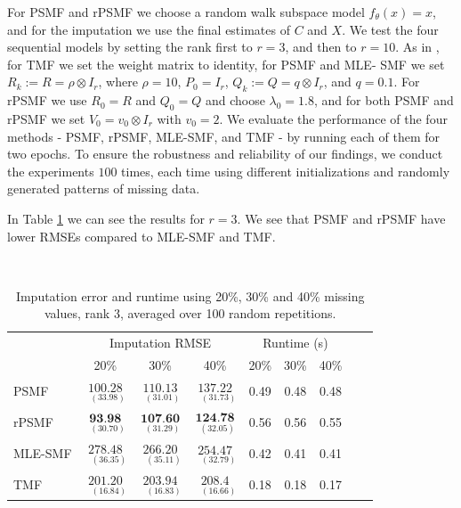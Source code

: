 \documentclass{mldsmsc}
\begin{document}
\noindent For PSMF and rPSMF we choose a random walk subspace model $f_{\theta}(x) = x$, and for the imputation we use the final estimates of $C$ and $X$. We test the four sequential models by setting the rank first to $r = 3$, and then to $r = 10$. As in \cite{akyildiz2021probabilistic}, for TMF we set the weight matrix to identity, for PSMF and MLE- SMF we set $R_k := R = \rho \otimes I_r$, where $\rho = 10$, $P_0 = I_r$, $Q_k := Q = q \otimes I_r$, and $q = 0.1$. For rPSMF we use $R_0 = R$ and $Q_0 = Q$ and choose $\lambda_0 = 1.8$, and for both PSMF and rPSMF we set $V_0 = v_0 \otimes I_r$ with $v_0 = 2$. We evaluate the performance of the four methods - PSMF, rPSMF, MLE-SMF, and TMF - by running each of them for two epochs. To ensure the robustness and reliability of our findings, we conduct the experiments $100$ times, each time using different initializations and randomly generated patterns of missing data. \newline

\noindent In Table \ref{tab:rmse3} we can see the results for $r = 3$. We see that PSMF and rPSMF have lower RMSEs compared to MLE-SMF and TMF.  \newline

\begin{table}[H]
\centering
\label{tab:rmse3}
 \\[0.5ex]
\begin{tabular}{@{}lccc|ccccc@{}}
\toprule
 & \multicolumn{3}{c}{Imputation RMSE} & \multicolumn{3}{c}{Runtime (s)} \\
 & 20\% & 30\% & 40\% & 20\% & 30\% & 40\% \\
\midrule
PSMF & $\underset{{\scriptscriptstyle \;\;(33.98)}}{100.28}$ & $\underset{{\scriptscriptstyle \;\;(31.01)}}{110.13}$ & $\underset{{\scriptscriptstyle \;\;\;(31.73)}}{137.22}$ & 0.49 & 0.48 & 0.48 \\
rPSMF & $\underset{{\scriptscriptstyle \;\;(30.70)}}{\textbf{93.98}}$ & $\underset{{\scriptscriptstyle \;\;(31.29)}}{\textbf{107.60}}$ & $\underset{{\scriptscriptstyle \;\;(32.05)}}{\textbf{124.78}}$ & 0.56 & 0.56 & 0.55 \\
MLE-SMF & $\underset{{\scriptscriptstyle \;\;\;(36.35)}}{278.48}$ & $\underset{{\scriptscriptstyle \;\;\;(35.11)}}{266.20}$ & $\underset{{\scriptscriptstyle \;\;\;(32.79)}}{254.47}$ & 0.42 & 0.41 & 0.41 \\
TMF & $\underset{{\scriptscriptstyle \;\;\;(16.84)}}{201.20}$ & $\underset{{\scriptscriptstyle \;\;\;(16.83)}}{203.94}$ & $\underset{{\scriptscriptstyle \;\;\;(16.66)}}{208.4}$ & 0.18 & 0.18 & 0.17 \\
\bottomrule
\end{tabular}
\caption{Imputation error and runtime using 20\%, 30\% and 40\% missing values, rank 3, averaged over 100 random repetitions.}
\end{table}
\end{document}
